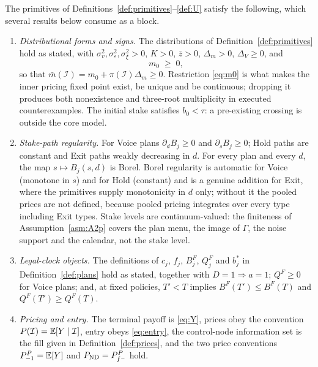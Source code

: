 \begin{assumption}
\label{asm:TR}
The primitives of Definitions~\ref{def:primitives}--\ref{def:U} satisfy the following, which several
results below consume as a block.
\begin{enumerate}[label=(TR-\roman*),leftmargin=3.2em,itemsep=3pt]
\item \emph{Distributional forms and signs.} The distributions of Definition~\ref{def:primitives}
  hold as stated, with $\sigma_v^2,\sigma_\varepsilon^2,\sigma_\xi^2 > 0$, $K > 0$, $\bar z > 0$,
  $\Delta_m > 0$, $\Delta_V \ge 0$, and
  \begin{equation}
  \label{eq:m0}
  m_0 \;\ge\; 0,
  \end{equation}
  so that $\bar m(\mathcal I) = m_0 + \pi(\mathcal I)\Delta_m \ge 0$. Restriction \eqref{eq:m0} is
  what makes the inner pricing fixed point exist, be unique and be continuous; dropping it produces
  both nonexistence and three-root multiplicity in executed counterexamples. The initial stake
  satisfies $b_0 < \tau$: a pre-existing crossing is outside the core model.
\item \emph{Stake-path regularity.} For Voice plans $\partial_d B_j \ge 0$ and
  $\partial_s B_j \ge 0$; Hold paths are constant and Exit paths weakly decreasing in $d$. For every
  plan and every $d$, the map $s \mapsto B_j(s,d)$ is Borel. Borel regularity is automatic for Voice
  (monotone in $s$) and for Hold (constant) and is a genuine addition for Exit, where the primitives
  supply monotonicity in $d$ only; without it the pooled prices are not defined, because pooled
  pricing integrates over every type including Exit types. Stake levels are continuum-valued: the
  finiteness of Assumption~\ref{asm:A2p} covers the plan menu, the image of $\Gamma$, the noise
  support and the calendar, not the stake level.
\item \emph{Legal-clock objects.} The definitions of $c_j$, $f_j$, $B_j^F$, $Q_j^F$ and $b_j^*$ in
  Definition~\ref{def:plans} hold as stated, together with $D = 1 \Rightarrow a = 1$; $Q^F \ge 0$ for
  Voice plans; and, at fixed policies, $T' < T$ implies $B^F(T') \le B^F(T)$ and
  $Q^F(T') \ge Q^F(T)$.
\item \emph{Pricing and entry.} The terminal payoff is \eqref{eq:Y}, prices obey the convention
  $P(\mathcal I) = \mathbb{E}[Y\mid\mathcal I]$, entry obeys \eqref{eq:entry}, the control-node information
  set is the fill given in Definition~\ref{def:prices}, and the two price conventions
  $P_{-1}^P = \mathbb{E}[Y]$ and $P_{\mathrm{ND}} = P_{f^-}^P$ hold.
\end{enumerate}
\end{assumption}

